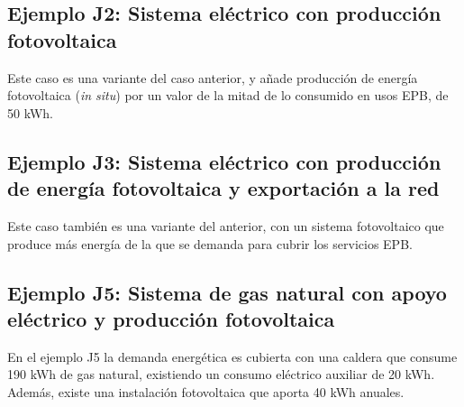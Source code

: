 \documentclass[10pt,notitlepage,oneside,a4paper]{article}
\begin{document}





\subsection{Ejemplo J2: Sistema eléctrico con producción fotovoltaica}

Este caso es una variante del caso anterior, y añade producción de energía fotovoltaica (\textit{in situ}) por un valor de la mitad de lo consumido en usos EPB, de 50 kWh.





\subsection{Ejemplo J3: Sistema eléctrico con producción de energía fotovoltaica y exportación a la red}

Este caso también es una variante del anterior, con un sistema fotovoltaico que produce más energía de la que se demanda para cubrir los servicios EPB.





\subsection{Ejemplo J5: Sistema de gas natural con apoyo eléctrico y producción fotovoltaica}
En el ejemplo J5 la demanda energética es cubierta con una caldera que consume 190 kWh de gas natural, existiendo un consumo eléctrico auxiliar de 20 kWh. Además, existe una instalación fotovoltaica que aporta 40 kWh anuales.
\end{document}
